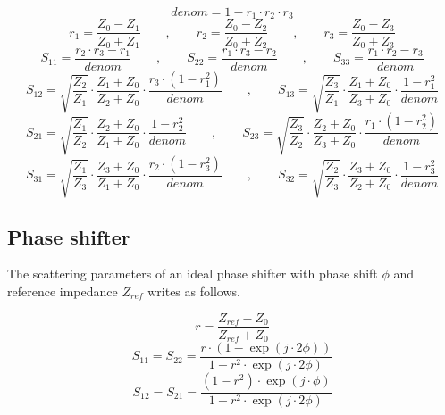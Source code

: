 \documentclass[10pt]{report}
\begin{document}
\begin{equation}
denom = 1-r_1\cdot r_2\cdot r_3
\end{equation}
\begin{equation}
r_1 = \frac{Z_0-Z_1}{Z_0+Z_1} \qquad,\qquad 
r_2 = \frac{Z_0-Z_2}{Z_0+Z_2} \qquad,\qquad 
r_3 = \frac{Z_0-Z_3}{Z_0+Z_3}
\end{equation}
\begin{equation}
S_{11} = \frac{r_2\cdot r_3 - r_1}{denom} \qquad,\qquad 
S_{22} = \frac{r_1\cdot r_3 - r_2}{denom} \qquad,\qquad 
S_{33} = \frac{r_1\cdot r_2 - r_3}{denom}
\end{equation}
\begin{equation}
S_{12} = \sqrt{\frac{Z_2}{Z_1}}\cdot\frac{Z_1+Z_0}{Z_2+Z_0}\cdot\frac{r_3\cdot(1-r_1^2)}{denom}
\qquad,\qquad 
S_{13} = \sqrt{\frac{Z_3}{Z_1}}\cdot\frac{Z_1+Z_0}{Z_3+Z_0}\cdot\frac{1-r_1^2}{denom}
\end{equation}
\begin{equation}
S_{21} = \sqrt{\frac{Z_1}{Z_2}}\cdot\frac{Z_2+Z_0}{Z_1+Z_0}\cdot\frac{1-r_2^2}{denom}
\qquad,\qquad 
S_{23} = \sqrt{\frac{Z_3}{Z_2}}\cdot\frac{Z_2+Z_0}{Z_3+Z_0}\cdot\frac{r_1\cdot(1-r_2^2)}{denom}
\end{equation}
\begin{equation}
S_{31} = \sqrt{\frac{Z_1}{Z_3}}\cdot\frac{Z_3+Z_0}{Z_1+Z_0}\cdot\frac{r_2\cdot(1-r_3^2)}{denom}
\qquad,\qquad 
S_{32} = \sqrt{\frac{Z_2}{Z_3}}\cdot\frac{Z_3+Z_0}{Z_2+Z_0}\cdot\frac{1-r_3^2}{denom}
\end{equation}

\subsection{Phase shifter}

The scattering parameters of an ideal phase shifter with phase shift
$\phi$ and reference impedance $Z_{ref}$ writes as follows.

\begin{equation}
r = \frac{Z_{ref}-Z_0}{Z_{ref}+Z_0}
\end{equation}
\begin{equation}
S_{11} = S_{22} = \frac{r\cdot\left(1-\exp\left(j\cdot 2\phi\right)\right)}{1-r^2\cdot\exp\left(j\cdot 2\phi\right)}
\end{equation}
\begin{equation}
S_{12} = S_{21} = \frac{(1-r^2)\cdot\exp\left(j\cdot\phi\right)}{1-r^2\cdot\exp\left(j\cdot 2\phi\right)}
\end{equation}
\end{document}
